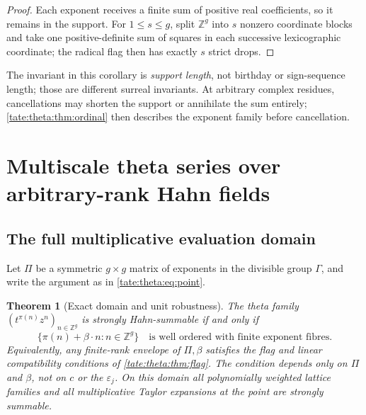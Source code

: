 \documentclass[11pt,letterpaper]{article}
\newtheorem{theorem}{Theorem}[section]
\theoremstyle{definition}
\newcommand{\Z}{\mathbb Z}
\begin{document}
\begin{proof}
Each exponent receives a finite sum of positive real coefficients, so it
remains in the support. For $1\le s\le g$, split $\Z^g$ into $s$ nonzero
coordinate blocks and take one positive-definite sum of squares in each
successive lexicographic coordinate; the radical flag then has exactly $s$
strict drops.
\end{proof}

The invariant in this corollary is \emph{support length}, not birthday or
sign-sequence length; those are different surreal invariants. At arbitrary
complex residues, cancellations may shorten the support or annihilate the
sum entirely; \cref{tate:theta:thm:ordinal} then describes the exponent
family before cancellation.

\section{Multiscale theta series over arbitrary-rank Hahn fields}\label{tate:theta:sec:theta}

\subsection{The full multiplicative evaluation domain}

Let $\Pi$ be a symmetric $g\times g$ matrix of exponents in the divisible
group $\Gamma$, and write the argument as in \eqref{tate:theta:eq:point}.

\begin{theorem}[Exact domain and unit robustness]\label{tate:theta:thm:units}
The theta family $(t^{\pi(n)}z^n)_{n\in\Z^g}$ is strongly Hahn-summable if
and only if
\begin{equation}
 \{\pi(n)+\beta\cdot n:n\in\Z^g\}
 \quad\text{is well ordered with finite exponent fibres.}
 \label{tate:theta:eq:intrinsicdomain}
\end{equation}
Equivalently, any finite-rank envelope of $\Pi,\beta$ satisfies the flag
and linear compatibility conditions of \cref{tate:theta:thm:flag}. The
condition depends only on $\Pi$ and $\beta$, not on $c$ or the
$\varepsilon_j$. On this domain all polynomially weighted lattice families
and all multiplicative Taylor expansions at the point are strongly
summable.
\end{theorem}
\end{document}

